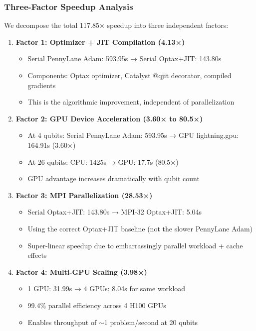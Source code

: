 \documentclass[11pt]{article}
\begin{document}
\subsubsection{Three-Factor Speedup Analysis}

We decompose the total 117.85× speedup into three independent factors:

\begin{enumerate}
    \item \textbf{Factor 1: Optimizer + JIT Compilation (4.13×)}
    \begin{itemize}
        \item Serial PennyLane Adam: 593.95s → Serial Optax+JIT: 143.80s
        \item Components: Optax optimizer, Catalyst @qjit decorator, compiled gradients
        \item This is the algorithmic improvement, independent of parallelization
    \end{itemize}
    
    \item \textbf{Factor 2: GPU Device Acceleration (3.60× to 80.5×)}
    \begin{itemize}
        \item At 4 qubits: Serial PennyLane Adam: 593.95s → GPU lightning.gpu: 164.91s (3.60×)
        \item At 26 qubits: CPU: 1425s → GPU: 17.7s (80.5×)
        \item GPU advantage increases dramatically with qubit count
    \end{itemize}
    
    \item \textbf{Factor 3: MPI Parallelization (28.53×)}
    \begin{itemize}
        \item Serial Optax+JIT: 143.80s → MPI-32 Optax+JIT: 5.04s
        \item Using the correct Optax+JIT baseline (not the slower PennyLane Adam)
        \item Super-linear speedup due to embarrassingly parallel workload + cache effects
    \end{itemize}
    
    \item \textbf{Factor 4: Multi-GPU Scaling (3.98×)}
    \begin{itemize}
        \item 1 GPU: 31.99s → 4 GPUs: 8.04s for same workload
        \item 99.4\% parallel efficiency across 4 H100 GPUs
        \item Enables throughput of $\sim$1 problem/second at 20 qubits
    \end{itemize}
\end{enumerate}
\end{document}

